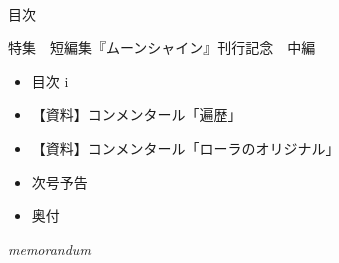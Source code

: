 \documentclass[10pt, a5paper, twoside]{jsarticle}
\theoremstyle{definition}
\begin{document}
	\begin{center}

	~ %

		\Large{目次}

		\vspace{5mm}

		\normalsize{特集　短編集『ムーンシャイン』刊行記念　中編}

	\end{center}

	\begin{itemize}

		\item 目次 \dotfill i

			\vspace{3mm}

		\item 【資料】コンメンタール「遍歴」 

			\vspace{3mm}

		\item 【資料】コンメンタール「ローラのオリジナル」 

			\vspace{3mm}

		\item 次号予告 

			\vspace{3mm}

		\item 奥付 

	\end{itemize}

	\vfill


	\newpage

	\begin{center}

		\Large{\textit{memorandum}}

	\end{center}
\end{document}
